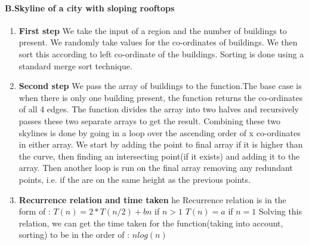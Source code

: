 \documentclass[a4paper,11pt]{article}
\begin{document}
\paragraph{B.Skyline of a city with sloping rooftops}
\begin{enumerate}
  \item \textbf{First step}
   We take the input of a region and the number of buildings to present.
   We randomly take values for the co-ordinates of buildings.
   We then sort this according to left co-ordinate of the buildings.
    Sorting is done using a standard merge sort technique.
  
  \item \textbf{Second step}
   We pass the array of buildings to the function.The base case is when there is only one building present, the function returns the co-ordinates of all 4 edges.
   The function divides the array into two halves and recursively passes these two separate arrays to get the result.
   Combining these two skylines is done by going in a loop over the ascending order of x co-ordinates in either array.
   We start by adding the point to final array if it is higher than the curve, then finding an intersecting point(if it exists) and adding it to the array.
   Then another loop is run on the final array removing any redundant points, i.e. if the are on the same height as the previous points. 
  
  \item \textbf{Recurrence relation and time taken}
  he Recurrence relation is in the form of :\newline
  $T(n)=2*T(n/2)+bn$ if $n>1$\newline
  $T(n)=a$         if $n=1$\newline
  Solving this relation, we can get the time taken for the function(taking into account, sorting) to be in the order of : 
  $nlog(n)$
  

\end{enumerate}
\end{document}
